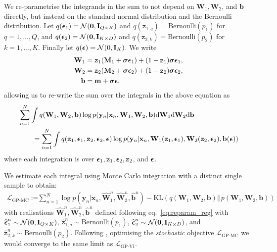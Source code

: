 \documentclass{article} %
\newcommand{\N}{\mathcal{N}}
\newcommand{\cL}{\mathcal{L}}
\newcommand{\td}{\text{d}}
\newcommand{\x}{\mathbf{x}}
\newcommand{\Bb}{\mathbf{b}}
\newcommand{\sBb}{\mathtt{z}}
\newcommand{\y}{\mathbf{y}}
\newcommand{\W}{\mathbf{W}}
\newcommand{\m}{\mathbf{m}}
\newcommand{\I}{\mathbf{I}}
\newcommand{\M}{\mathbf{M}}
\newcommand{\bz}{\mathbf{0}}
\newcommand{\bepsilon}{\text{\boldmath$\epsilon$}}
\newcommand{\bsigma}{\text{\boldmath$\sigma$}}
\newcommand{\KL}{\text{KL}}
\theoremstyle{definition}
\begin{document}
We re-parametrise the integrands in the sum to not depend on $\W_1, \W_2$, and $\Bb$ directly, but instead on the standard normal distribution and the Bernoulli distribution. 
Let $q(\bepsilon_1) = \N(\bz, \I_{Q \times K})$ and $q(\sBb_{1,q}) = \text{Bernoulli}(p_1)$ for $q = 1, ..., Q$, and $q(\bepsilon_2) = \N(\bz, \I_{K \times D})$ and $q(\sBb_{2,k}) = \text{Bernoulli}(p_2)$ for $k = 1, ..., K$. Finally let $q(\bepsilon) = \N(0, \I_K)$. We write 
\begin{align} \label{eq:reparam_reg}
\W_1 &= \sBb_1 (\M_1 + \bsigma \bepsilon_1) + (1-\sBb_1) \bsigma \bepsilon_1 , \notag\\
\W_2 &= \sBb_2 (\M_2 + \bsigma \bepsilon_2) + (1-\sBb_2) \bsigma \bepsilon_2 , \notag\\
\Bb &= \m + \bsigma \bepsilon, 
\end{align}
allowing us to re-write the sum over the integrals in the above equation as 
\begin{align*}
&\sum_{n=1}^N \int q(\W_1, \W_2, \Bb) \log p(\y_n | \x_n, \W_1, \W_2, \Bb) \td \W_1 \td \W_2 \td \Bb \\
&\qquad = \sum_{n=1}^N \int q ( \sBb_1, \bepsilon_1, \sBb_2, \bepsilon_2, \bepsilon ) \log p(\y_n | \x_n, \W_1(\sBb_1, \bepsilon_1), \W_2 ( \sBb_2, \bepsilon_2 ), \Bb (\bepsilon)) %
\end{align*}
where each integration is over $\bepsilon_1, \sBb_1, \bepsilon_2, \sBb_2$, and $\bepsilon$.

We estimate each integral using Monte Carlo integration with a distinct single sample to obtain:
\begin{align*}
\cL_{\text{GP-MC}} := &\sum_{n=1}^N \log p(\y_n | \x_n, \widehat{\W}_1^n, \widehat{\W}_2^n, \widehat{\Bb}^n) - \KL(q(\W_1, \W_2, \Bb) || p(\W_1, \W_2, \Bb))
\end{align*}
with realisations $\widehat{\W}_1^n, \widehat{\W}_2^n, \widehat{\Bb}^n$ defined following eq.\ \eqref{eq:reparam_reg} with $\widehat{\bepsilon}_1^n \sim \N(\bz, \I_{Q \times K})$, $\widehat{\sBb}_{1,q}^n \sim \text{Bernoulli}(p_1)$, $\widehat{\bepsilon}_2^n \sim \N(\bz, \I_{K \times D})$, and $\widehat{\sBb}_{2,k}^n \sim \text{Bernoulli}(p_2)$.
Following \citep{blei2012variational,hoffman2013stochastic,kingma2013auto,rezende2014stochastic,titsias2014doubly}, optimising the \textit{stochastic} objective $\cL_{\text{GP-MC}}$ we would converge to the same limit as $\cL_{\text{GP-VI}}$. 
\end{document}
